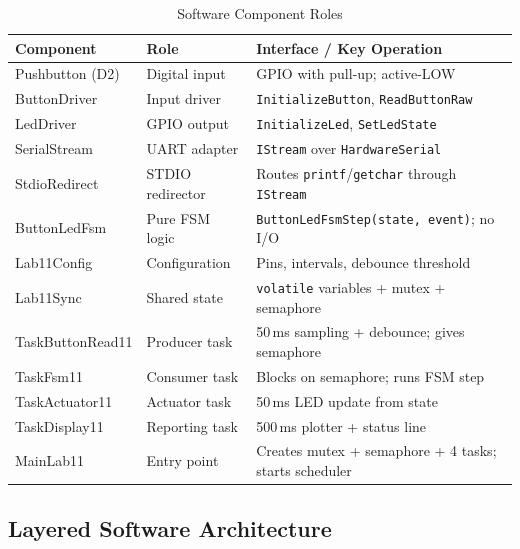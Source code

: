 \documentclass[12pt]{article}
\begin{document}
\begin{table}[H]
\centering
\begin{tabular}{@{}p{3.6cm}p{2.8cm}p{6.0cm}@{}}
\toprule
\textbf{Component} & \textbf{Role} & \textbf{Interface / Key Operation} \\
\midrule
Pushbutton (D2)     & Digital input       & GPIO with pull-up; active-LOW \\
ButtonDriver        & Input driver        & \texttt{InitializeButton}, \texttt{ReadButtonRaw} \\
LedDriver           & GPIO output         & \texttt{InitializeLed}, \texttt{SetLedState} \\
SerialStream        & UART adapter        & \texttt{IStream} over \texttt{HardwareSerial} \\
StdioRedirect       & STDIO redirector    & Routes \texttt{printf}/\texttt{getchar} through \texttt{IStream} \\
ButtonLedFsm        & Pure FSM logic      & \texttt{ButtonLedFsmStep(state, event)}; no I/O \\
Lab11Config         & Configuration       & Pins, intervals, debounce threshold \\
Lab11Sync           & Shared state        & \texttt{volatile} variables + mutex + semaphore \\
TaskButtonRead11    & Producer task       & 50\,ms sampling + debounce; gives semaphore \\
TaskFsm11           & Consumer task       & Blocks on semaphore; runs FSM step \\
TaskActuator11      & Actuator task       & 50\,ms LED update from state \\
TaskDisplay11       & Reporting task      & 500\,ms plotter + status line \\
MainLab11           & Entry point         & Creates mutex + semaphore + 4 tasks; starts scheduler \\
\bottomrule
\end{tabular}
\caption{Software Component Roles}
\label{tab:components}
\end{table}

\subsection{Layered Software Architecture}
\end{document}
